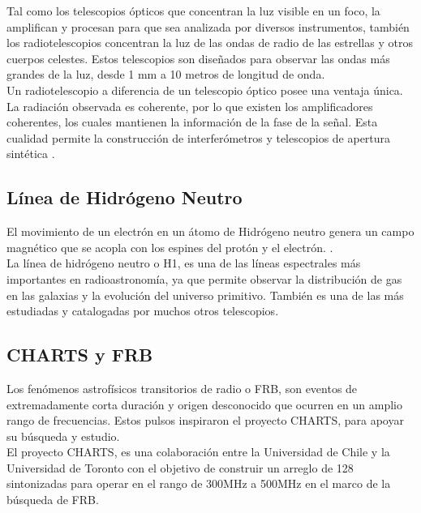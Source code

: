 Tal como los telescopios ópticos que concentran la luz visible en un foco, la amplifican y procesan para que sea analizada por diversos instrumentos, también los radiotelescopios concentran la luz de las ondas de radio de las estrellas y otros cuerpos celestes. Estos telescopios son diseñados para observar las ondas más grandes de la luz, desde 1 mm a 10 metros de longitud de onda. \cite{nraoRadioTelescopes}\\

Un radiotelescopio a diferencia de un telescopio óptico posee una ventaja única. La radiación observada es coherente, por lo que existen los amplificadores coherentes, los cuales mantienen la información de la fase de la señal. Esta cualidad permite la construcción de interferómetros y telescopios de apertura sintética \cite{Ransom2016}.\\ 

\subsection{Línea de Hidrógeno Neutro}

El movimiento de un electrón en un átomo de Hidrógeno neutro genera un campo magnético que se acopla con los espines del protón y el electrón.  \cite{Restrepo2023}.\\

La línea de hidrógeno neutro o H1, es una de las líneas espectrales más importantes en radioastronomía, ya que permite observar la distribución de gas en las galaxias y la evolución del universo primitivo. También es una de las más estudiadas y catalogadas por muchos otros telescopios.\\

\subsection{CHARTS y FRB}

Los fenómenos astrofísicos transitorios de radio o FRB, son eventos de extremadamente corta duración y origen desconocido que ocurren en un amplio rango de frecuencias. Estos pulsos inspiraron el proyecto CHARTS, para apoyar su búsqueda y estudio.\\

El proyecto CHARTS, es una colaboración entre la Universidad de Chile y la Universidad de Toronto con el objetivo de construir un arreglo de 128 sintonizadas para operar en el rango de 300MHz a 500MHz en el marco de la búsqueda de FRB.\\


